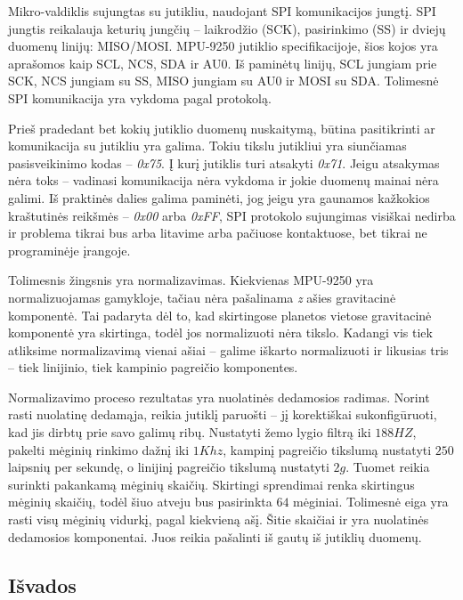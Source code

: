 Mikro-valdiklis sujungtas su jutikliu, naudojant SPI komunikacijos jungtį.
SPI jungtis reikalauja keturių jungčių -- laikrodžio (SCK), pasirinkimo (SS) ir dviejų duomenų linijų: MISO/MOSI.
MPU-9250 jutiklio specifikacijoje, šios kojos yra aprašomos kaip SCL, NCS, SDA ir AU0.
Iš paminėtų linijų, SCL jungiam prie SCK, NCS jungiam su SS, MISO jungiam su AU0 ir MOSI su SDA.
Tolimesnė SPI komunikacija yra vykdoma pagal protokolą.

Prieš pradedant bet kokių jutiklio duomenų nuskaitymą, būtina pasitikrinti ar komunikacija su jutikliu yra galima.
Tokiu tikslu jutikliui yra siunčiamas pasisveikinimo kodas -- \textit{0x75}.
Į kurį jutiklis turi atsakyti \textit{0x71}.
Jeigu atsakymas nėra toks -- vadinasi komunikacija nėra vykdoma ir jokie duomenų mainai nėra galimi.
Iš praktinės dalies galima paminėti, jog jeigu yra gaunamos kažkokios kraštutinės reikšmės -- \textit{0x00} arba \textit{0xFF}, SPI protokolo sujungimas visiškai nedirba ir problema tikrai bus arba litavime arba pačiuose kontaktuose, bet tikrai ne programinėje įrangoje.

Tolimesnis žingsnis yra normalizavimas.
Kiekvienas MPU-9250 yra normalizuojamas gamykloje, tačiau nėra pašalinama \textit{z} ašies gravitacinė komponentė.
Tai padaryta dėl to, kad skirtingose planetos vietose gravitacinė komponentė yra skirtinga, todėl jos normalizuoti nėra tikslo.
Kadangi vis tiek atliksime normalizavimą vienai ašiai -- galime iškarto normalizuoti ir likusias tris -- tiek linijinio, tiek kampinio pagreičio komponentes.

Normalizavimo proceso rezultatas yra nuolatinės dedamosios radimas.
Norint rasti nuolatinę dedamąja, reikia jutiklį paruošti -- jį korektiškai sukonfigūruoti, kad jis dirbtų prie savo galimų ribų.
Nustatyti žemo lygio filtrą iki $188 HZ$, pakelti mėginių rinkimo dažnį iki $1Khz$, kampinį pagreičio tikslumą nustatyti $250$ laipsnių per sekundę, o linijinį pagreičio tikslumą nustatyti $2g$.
Tuomet reikia surinkti pakankamą mėginių skaičių.
Skirtingi sprendimai renka skirtingus mėginių skaičių, todėl šiuo atveju bus pasirinkta $64$ mėginiai.
Tolimesnė eiga yra rasti visų mėginių vidurkį, pagal kiekvieną ašį.
Šitie skaičiai ir yra nuolatinės dedamosios komponentai. Juos reikia pašalinti iš gautų iš jutiklių duomenų.

\subsection{Išvados}

